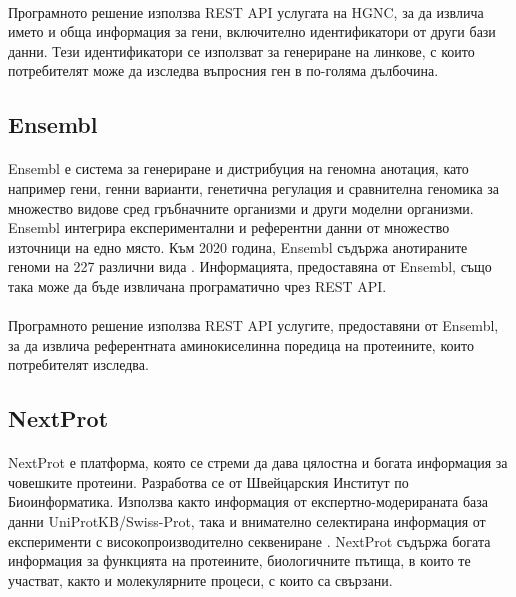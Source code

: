 \documentclass[pdftex,cyrillic,14pt,a4page,twoside,openright]{extreport}
\begin{document}
\paragraph{}
Програмното решение използва REST API услугата на HGNC, за да извлича името и обща информация за гени, включително идентификатори от други бази данни. Тези идентификатори се използват за генериране на линкове, с които потребителят може да изследва въпросния ген в по-голяма дълбочина.

\subsection{Ensembl}\label{sec:ensembl}
\paragraph{}
Ensembl е система за генериране и дистрибуция на геномна анотация, като например гени, генни варианти, генетична регулация и сравнителна геномика за множество видове сред гръбначните организми и други моделни организми. Ensembl интегрира експериментални и референтни данни от множество източници на едно място. Към 2020 година, Ensembl съдържа анотираните геноми на 227 различни вида \cite{yates2020}. Информацията, предоставяна от Ensembl, също така може да бъде извличана програматично чрез REST API.

\paragraph{}
Програмното решение използва REST API услугите, предоставяни от Ensembl, за да извлича референтната аминокиселинна поредица на протеините, които потребителят изследва.

\subsection{NextProt}\label{sec:nextprot}
\paragraph{}
NextProt е платформа, която се стреми да дава цялостна и богата информация за човешките протеини. Разработва се от Швейцарския Институт по Биоинформатика. Използва както информация от експертно-модерираната база данни UniProtKB/Swiss-Prot, така и внимателно селектирана информация от експерименти с високопроизводително секвениране \cite{lane2011}. NextProt съдържа богата информация за функцията на протеините, биологичните пътища, в които те участват, както и молекулярните процеси, с които са свързани.
\end{document}
